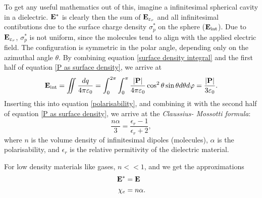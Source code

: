        To get any useful mathematics out of this, imagine a infinitesimal spherical cavity in a dielectric. 
        $\mathbf{E}^*$ is clearly then the sum of $\mathbf{E}_{\varepsilon_r}$ 
        and all infinitesimal contibutions due to the surface charge density $\sigma_p^*$ on the sphere ($\mathbf{E}_\text{int}$). 
        Due to $\mathbf{E}_{\varepsilon_r}$, $\sigma_p^*$ is not uniform, since the molecules tend to align with the applied electric field. 
        The configuration is symmetric in the polar angle, depending only on the azimuthal angle $\theta$. 
        By combining equation \eqref{surface density integral} and the first half of equation \eqref{P as surface density}, we arrive at
        \begin{equation}
            \mathbf{E}_\text{int} = \iint \frac{dq}{4\pi\varepsilon_0} 
            = \int_0^{2\pi}\int_0^\pi\frac{|\mathbf{P} |}{4\pi\varepsilon_0}\cos^2\theta\sin\theta d\theta d\varphi = \frac{|\mathbf{P} |}{3\varepsilon_0}.
        \end{equation}
        Inserting this into equation \eqref{polarisability}, and combining it with the second half of equation \eqref{P as surface density}, 
        we arrive at the \textit{Claussius- Mossotti formula}:
        \begin{equation}
            \frac{n\alpha}{3} = \frac{\epsilon_r-1}{\epsilon_r +2}, 
        \end{equation}
        where $n$ is the volume density of infinitesimal dipoles (molecules), $\alpha$ is the polarisability, 
        and $\epsilon_r$ is the relative permitivity of the dielectric material. 

        For low density materials like gases, $n << 1$, and we get the approximations
        \begin{align}
            \mathbf{E}^* &= \mathbf{E} \\
            \chi_e &= n\alpha.
        \end{align}

